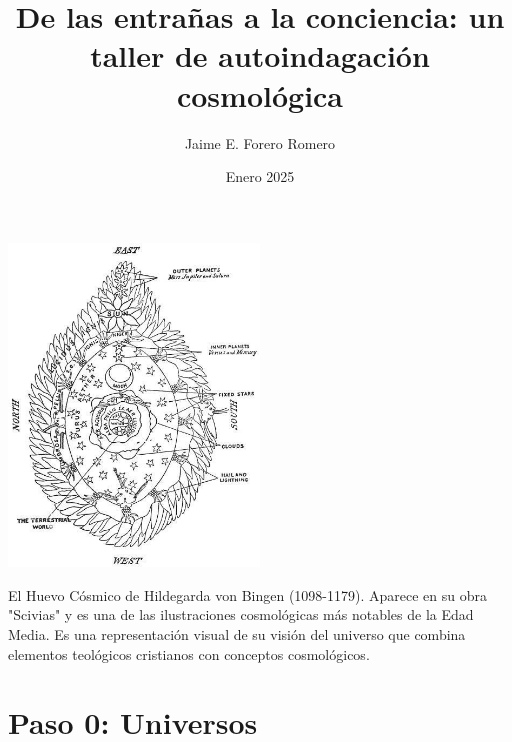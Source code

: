 \documentclass[statementpaper,oneside,article,10pt]{memoir}
\newcommand{\BackgroundPic}[1]{%
\put(0,0){%
\parbox[b][\paperheight]{\paperwidth}{%
\vfill
\centering
{\transparent{0.4} \texttt{[image: \#1]}}%
\vfill
}}}
\begin{document}

\title{De las entrañas a la conciencia: un taller de autoindagación cosmológica}
\author{Jaime E. Forero Romero}
\date{Enero 2025}


\begingroup
\let\cleardoublepage\clearpage


\begin{titlingpage}
\maketitle


\begin{center}
\includegraphics[width=0.5\textwidth]{universe-egg.jpg}
\end{center}
{\tiny{El Huevo Cósmico de Hildegarda von Bingen (1098-1179). Aparece en su obra "Scivias" y es una de las ilustraciones cosmológicas más notables de la Edad Media. Es una representación visual de su visión del universo que combina elementos teológicos cristianos con conceptos cosmológicos.}}


\end{titlingpage}

\endgroup

\pagestyle{empty}




\section{Paso 0: Universos}
\end{document}
